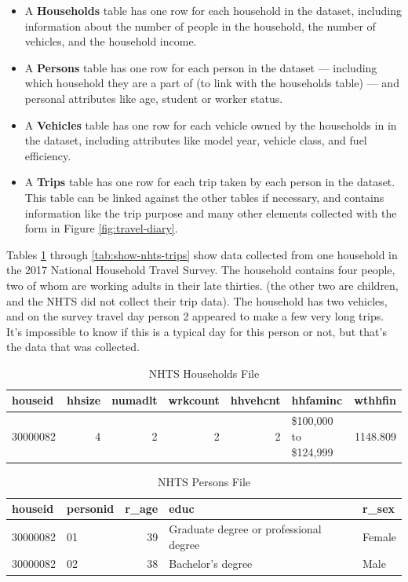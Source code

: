 \documentclass[]{book}
\providecommand{\tightlist}{%
  \setlength{\itemsep}{0pt}\setlength{\parskip}{0pt}}
\begin{document}
\begin{itemize}
\tightlist
\item
  A \textbf{Households} table has one row for each household in the dataset, including
  information about the number of people in the household, the number of vehicles,
  and the household income.
\item
  A \textbf{Persons} table has one row for each person in the dataset --- including
  which household they are a part of (to link with the households table) --- and
  personal attributes like age, student or worker status.
\item
  A \textbf{Vehicles} table has one row for each vehicle owned by the households in
  in the dataset, including attributes like model year, vehicle class, and fuel
  efficiency.
\item
  A \textbf{Trips} table has one row for each trip taken by each person in the dataset.
  This table can be linked against the other tables if necessary, and contains
  information like the trip purpose and many other elements collected with the form
  in Figure \ref{fig:travel-diary}.
\end{itemize}

Tables \ref{tab:show-nhts-hh} through \ref{tab:show-nhts-trips} show
data collected from one household in the 2017 National Household Travel Survey.
The household contains four people, two of whom are working adults in their late
thirties. (the other two are children, and the NHTS did not collect their trip
data). The household has two vehicles, and on the survey travel day person 2
appeared to make a few very long trips. It's impossible to know if this
is a typical day for this person or not, but that's the data that was collected.

\begin{table}

\caption{\label{tab:show-nhts-hh}NHTS Households File}
\centering
\begin{tabular}[t]{l|r|r|r|r|l|r}
\hline
houseid & hhsize & numadlt & wrkcount & hhvehcnt & hhfaminc & wthhfin\\
\hline
30000082 & 4 & 2 & 2 & 2 & \$100,000 to \$124,999 & 1148.809\\
\hline
\end{tabular}
\end{table}

\begin{table}

\caption{\label{tab:show-nhts-persons}NHTS Persons File}
\centering
\begin{tabular}[t]{l|l|r|l|l}
\hline
houseid & personid & r\_age & educ & r\_sex\\
\hline
30000082 & 01 & 39 & Graduate degree or professional degree & Female\\
\hline
30000082 & 02 & 38 & Bachelor's degree & Male\\
\hline
\end{tabular}
\end{table}
\end{document}

